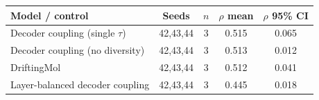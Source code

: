 \begin{tabular}{l c c c c}
\toprule
Model / control & Seeds & $n$ & $\rho$ mean & $\rho$ 95\% CI \\
\midrule
Decoder coupling (single $\tau$) & 42,43,44 & 3 & 0.515 & 0.065 \\
Decoder coupling (no diversity) & 42,43,44 & 3 & 0.513 & 0.012 \\
DriftingMol & 42,43,44 & 3 & 0.512 & 0.041 \\
Layer-balanced decoder coupling & 42,43,44 & 3 & 0.445 & 0.018 \\
\bottomrule
\end{tabular}
